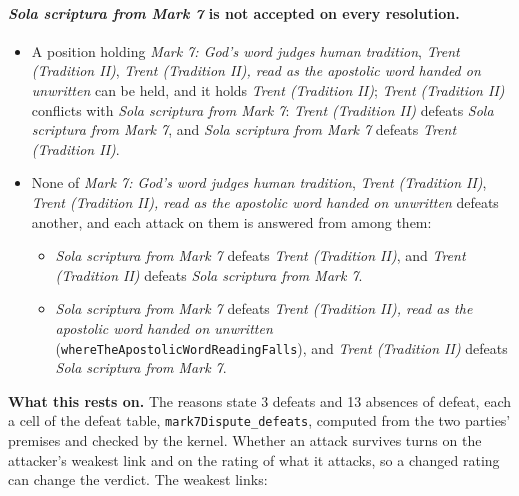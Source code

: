 \documentclass[11pt]{article}
\begin{document}
\paragraph{\emph{Sola scriptura from Mark 7} is not accepted on every resolution.}
\begin{itemize}
\item A position holding \emph{Mark 7: God's word judges human tradition}, \emph{Trent (Tradition II)}, \emph{Trent (Tradition II), read as the apostolic word handed on unwritten} can be held, and it holds \emph{Trent (Tradition II)}; \emph{Trent (Tradition II)} conflicts with \emph{Sola scriptura from Mark 7}: \emph{Trent (Tradition II)} defeats \emph{Sola scriptura from Mark 7}, and \emph{Sola scriptura from Mark 7} defeats \emph{Trent (Tradition II)}.
\item None of \emph{Mark 7: God's word judges human tradition}, \emph{Trent (Tradition II)}, \emph{Trent (Tradition II), read as the apostolic word handed on unwritten} defeats another, and each attack on them is answered from among them:
\begin{itemize}
\item \emph{Sola scriptura from Mark 7} defeats \emph{Trent (Tradition II)}, and \emph{Trent (Tradition II)} defeats \emph{Sola scriptura from Mark 7}.
\item \emph{Sola scriptura from Mark 7} defeats \emph{Trent (Tradition II), read as the apostolic word handed on unwritten} (\texttt{where\allowbreak{}The\allowbreak{}Apostolic\allowbreak{}Word\allowbreak{}Reading\allowbreak{}Falls}), and \emph{Trent (Tradition II)} defeats \emph{Sola scriptura from Mark 7}.
\end{itemize}
\end{itemize}
\par\noindent\textbf{What this rests on.} The reasons state 3 defeats and 13 absences of defeat, each a cell of the defeat table, \texttt{mark7\allowbreak{}Dispute\_\allowbreak{}defeats}, computed from the two parties' premises and checked by the kernel. Whether an attack survives turns on the attacker's weakest link and on the rating of what it attacks, so a changed rating can change the verdict. The weakest links:
\end{document}
